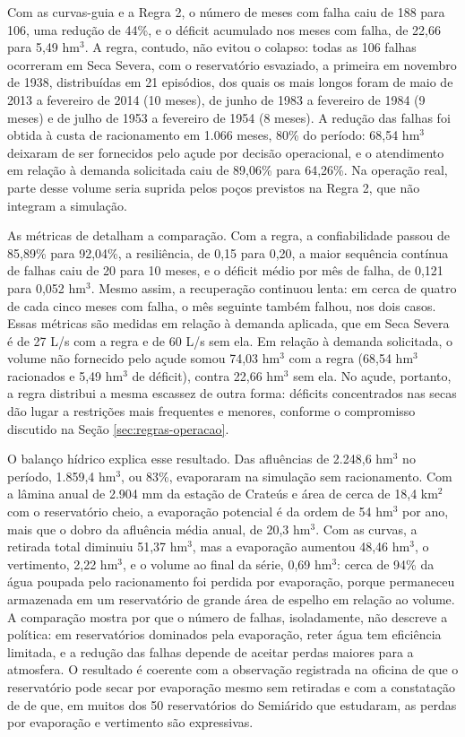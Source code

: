 Com as curvas-guia e a Regra 2, o número de meses com falha caiu de 188 para 106, uma redução de 44\%, e o déficit acumulado nos meses com falha, de 22,66 para 5,49 hm$^3$. A regra, contudo, não evitou o colapso: todas as 106 falhas ocorreram em Seca Severa, com o reservatório esvaziado, a primeira em novembro de 1938, distribuídas em 21 episódios, dos quais os mais longos foram de maio de 2013 a fevereiro de 2014 (10 meses), de junho de 1983 a fevereiro de 1984 (9 meses) e de julho de 1953 a fevereiro de 1954 (8 meses). A redução das falhas foi obtida à custa de racionamento em 1.066 meses, 80\% do período: 68,54 hm$^3$ deixaram de ser fornecidos pelo açude por decisão operacional, e o atendimento em relação à demanda solicitada caiu de 89,06\% para 64,26\%. Na operação real, parte desse volume seria suprida pelos poços previstos na Regra 2, que não integram a simulação.

As métricas de  detalham a comparação. Com a regra, a confiabilidade passou de 85,89\% para 92,04\%, a resiliência, de 0,15 para 0,20, a maior sequência contínua de falhas caiu de 20 para 10 meses, e o déficit médio por mês de falha, de 0,121 para 0,052 hm$^3$. Mesmo assim, a recuperação continuou lenta: em cerca de quatro de cada cinco meses com falha, o mês seguinte também falhou, nos dois casos. Essas métricas são medidas em relação à demanda aplicada, que em Seca Severa é de 27 L/s com a regra e de 60 L/s sem ela. Em relação à demanda solicitada, o volume não fornecido pelo açude somou 74,03 hm$^3$ com a regra (68,54 hm$^3$ racionados e 5,49 hm$^3$ de déficit), contra 22,66 hm$^3$ sem ela. No açude, portanto, a regra distribui a mesma escassez de outra forma: déficits concentrados nas secas dão lugar a restrições mais frequentes e menores, conforme o compromisso discutido na Seção \ref{sec:regras-operacao}.

O balanço hídrico explica esse resultado. Das afluências de 2.248,6 hm$^3$ no período, 1.859,4 hm$^3$, ou 83\%, evaporaram na simulação sem racionamento. Com a lâmina anual de 2.904 mm da estação de Crateús e área de cerca de 18,4 km$^2$ com o reservatório cheio, a evaporação potencial é da ordem de 54 hm$^3$ por ano, mais que o dobro da afluência média anual, de 20,3 hm$^3$. Com as curvas, a retirada total diminuiu 51,37 hm$^3$, mas a evaporação aumentou 48,46 hm$^3$, o vertimento, 2,22 hm$^3$, e o volume ao final da série, 0,69 hm$^3$: cerca de 94\% da água poupada pelo racionamento foi perdida por evaporação, porque permaneceu armazenada em um reservatório de grande área de espelho em relação ao volume. A comparação mostra por que o número de falhas, isoladamente, não descreve a política: em reservatórios dominados pela evaporação, reter água tem eficiência limitada, e a redução das falhas depende de aceitar perdas maiores para a atmosfera. O resultado é coerente com a observação registrada na oficina de que o reservatório pode secar por evaporação mesmo sem retiradas \cite{oficinaFlorDoCampo2026} e com a constatação de  de que, em muitos dos 50 reservatórios do Semiárido que estudaram, as perdas por evaporação e vertimento são expressivas.

